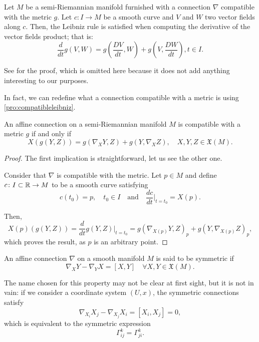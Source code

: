\begin{proposition}
	\label{pro:compatibleleibniz}
	Let $M$ be a semi-Riemannian manifold furnished with a connection $\nabla$ compatible with the metric $g$. Let $c \colon I \to M$ be a smooth curve and $V$ and $W$ two vector fields along $c$. Then, the Leibniz rule is satisfied when computing the derivative of the vector fields product; that is:
	\[
		\frac{d}{dt}g(V,W) = g(\frac{DV}{dt}, W) + g(V, \frac{DW}{dt}), t \in I.
	\]
\end{proposition}

See \cite[Ch. 2, Section 3, Proposition 3.2]{docarmo79} for the proof, which is omitted here because it does not add anything interesting to our purposes.

In fact, we can redefine what a connection compatible with a metric is using \autoref{pro:compatibleleibniz}.

\begin{corollary}
	An affine connection on a semi-Riemannian manifold $M$ is compatible with a metric $g$ if and only if
	\[
		X(g(Y,Z)) = g(\nabla_X Y, Z) + g(Y, \nabla_X Z), \quad X, Y, Z \in \mathfrak{X}(M).
	\]
\end{corollary}

\begin{proof}
	The first implication is straightforward, let us see the other one.

	Consider that $\nabla$ is compatible with the metric. Let $p \in M$ and define $c \colon I \subset \mathbb{R} \to M$ to be a smooth curve satisfying
	\[
		c(t_0) = p, \quad t_0 \in I \quad \textrm{and} \quad \frac{dc}{dt} \Bigr|_{t = t_0} = X(p).
	\]
	
	Then,
	\[
		X(p)\left(g(Y,Z)\right) = \frac{d}{dt}g(Y,Z)\Bigr|_{t=t_0} = g(\nabla_{X(p)} Y, Z)_p + g(Y, \nabla_{X(p)} Z)_p,
	\]
	which proves the result, as $p$ is an arbitrary point.
\end{proof}

\begin{definition}
	An affine connection $\nabla$ on a smooth manifold $M$ is said to be symmetric if
	\[
		\nabla_X Y - \nabla_Y X = [X, Y] \quad \forall X,Y \in \mathfrak{X}(M).
	\]
\end{definition}

The name chosen for this property may not be clear at first sight, but it is not in vain: if we consider a coordinate system $(U,x)$, the symmetric connections satisfy
\[
	\nabla_{X_i} X_j - \nabla_{X_j} X_i = [X_i, X_j] = 0,
\]
which is equivalent to the symmetric expression
\[
	\Gamma^k_{ij} = \Gamma^k_{ji}.
\]

